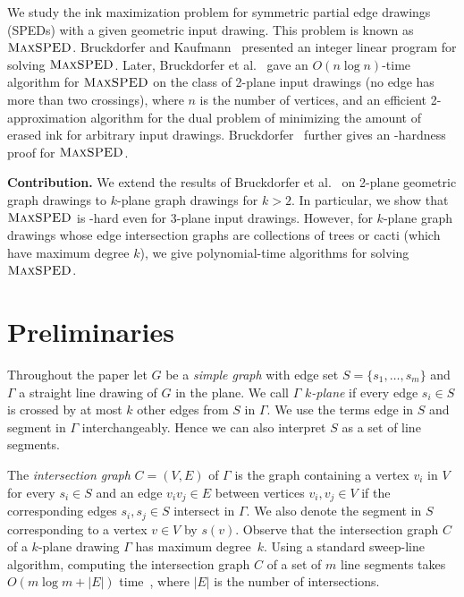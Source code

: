 \documentclass[a4paper, USenglish]{llncs}
\newcommand{\maxsped}{\ensuremath{\textsc{MaxSPED}}\xspace}
\begin{document}
	We study the ink maximization problem for symmetric partial edge drawings (SPEDs) with a given geometric input drawing.
	This problem is known as \maxsped. 
	Bruckdorfer and Kaufmann~\cite{bk-ecbe-12} presented an integer linear program for solving \maxsped. 
	Later, Bruckdorfer et al.~\cite{bcgkmn-pped-17} gave an $O(n \log n)$-time algorithm for \maxsped on the class of 2-plane input drawings (no edge has more than two crossings), where $n$ is the number of vertices, and an efficient 2-approximation algorithm for the dual problem of minimizing the amount of erased ink for arbitrary input drawings.
	Bruckdorfer~\cite{b-sgh-15} further gives an \NP-hardness proof for \maxsped.
	
	\medskip
	
	\noindent\textbf{Contribution.} We extend the results of Bruckdorfer et al.~\cite{bcgkmn-pped-17} on 2-plane geometric graph drawings to $k$-plane graph drawings for $k > 2$. 
	In particular, we show that \maxsped is \NP-hard even for 3-plane input drawings. 
	However, for $k$-plane graph drawings whose edge intersection graphs are collections of trees or cacti (which have maximum degree $k$), we give polynomial-time algorithms for solving \maxsped.
	
	\section{Preliminaries}\label{sec:preliminaries}
	
	Throughout the paper let $ G $ be a \emph{simple graph} with edge set $ S = \{s_1,\dots,s_m\}$ and $ \Gamma $ a straight line drawing of $ G $ in the plane. We call $ \Gamma $ \emph{$ k $-plane} if every edge $ s_i \in S $ is crossed by at most $ k $ other edges from $ S $ in $ \Gamma $. We use the terms edge in $ S $ and segment in $ \Gamma $ interchangeably. %
	Hence we can also interpret $S$ as a set of line segments.
	
	The \emph{intersection graph} $ C = (V,E) $ of $ \Gamma $ is the graph containing a vertex $v_i$ in $ V $ for every $ s_i \in S $ and an edge $ v_i v_j \in E $ between vertices $ v_i, v_j \in V $ if the corresponding edges $ s_i, s_j \in S $ intersect in $ \Gamma $. 
	We also denote the segment in $S$ corresponding to a vertex $v \in V$ by $s(v)$.
	Observe that the intersection graph $ C $ of a $ k $-plane drawing $ \Gamma $ has maximum degree~$ k $.  
	Using a standard sweep-line algorithm, computing the intersection graph $C$ of a set of $m$ line segments takes $O(m \log m + |E|)$ time~\cite{bcko-cgaa-08}, where $|E|$ is  the number of intersections.
	
\end{document}
